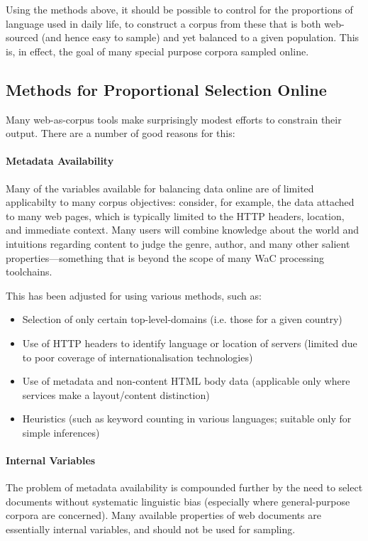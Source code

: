 Using the methods above, it should be possible to control for the proportions of language used in daily life, to construct a corpus from these that is both web-sourced (and hence easy to sample) and yet balanced to a given population.  This is, in effect, the goal of many special purpose corpora sampled online.

\subsection{Methods for Proportional Selection Online}
Many web-as-corpus tools make surprisingly modest efforts to constrain their output.  There are a number of good reasons for this:

\paragraph{Metadata Availability}
Many of the variables available for balancing data online are of limited applicabilty to many corpus objectives: consider, for example, the data attached to many web pages, which is typically limited to the HTTP headers, location, and immediate context.  Many users will combine knowledge about the world and intuitions regarding content to judge the genre, author, and many other salient properties---something that is beyond the scope of many WaC processing toolchains.

This has been adjusted for using various methods, such as:

\begin{itemize}
    \item Selection of only certain top-level-domains (i.e. those for a given country)
    \item Use of HTTP headers to identify language or location of servers (limited due to poor coverage of internationalisation technologies)
    \item Use of metadata and non-content HTML body data (applicable only where services make a layout/content distinction)
    \item Heuristics (such as keyword counting in various languages; suitable only for simple inferences)
\end{itemize}


\paragraph{Internal Variables}
The problem of metadata availability is compounded further by the need to select documents without systematic linguistic bias (especially where general-purpose corpora are concerned).  Many available properties of web documents are essentially internal variables, and should not be used for sampling.

